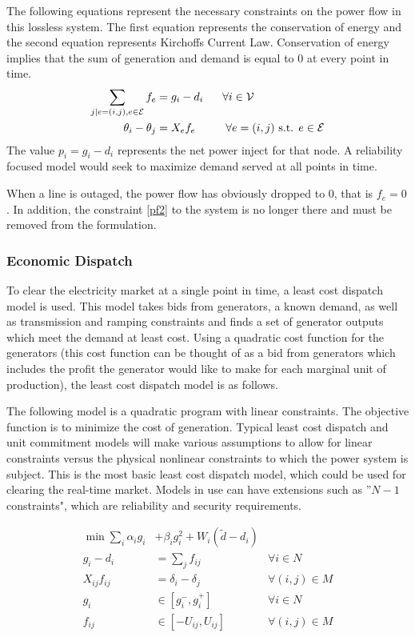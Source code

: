 The following equations represent the necessary constraints on the power flow in this lossless system.  The first equation represents the conservation of energy and the second equation represents Kirchoffs Current Law.  Conservation of energy implies that the sum of generation and demand is equal to 0 at every point in time.
\begin{align}	\displaystyle
\sum_{j | e=(i,j),  e \in \cE}{f_{e}} &= g_{i} -d_{i} \hspace{17px}   \forall i \in \cV   \label{pf1}
\\
\theta_{i} - \theta_{j} &= X_{e} f_{e}			\hspace{27px}	\forall e=(i,j) \mbox{ s.t. } e \in \cE   \label{pf2}
\end{align}
The value $p_{i} = g_{i} - d_{i}$ represents the net power inject for that node.  A reliability focused model would seek to maximize demand served at all points in time.

When a line is outaged, the power flow has obviously dropped to 0, that is $f_e = 0$.  In addition, the constraint \ref{pf2} to the system is no longer there and must be removed from the formulation.

\subsubsection{Economic Dispatch}
To clear the electricity market at a single point in time, a least cost dispatch model is used.  This model takes bids from generators, a known demand, as well as transmission and ramping constraints and finds a set of generator outputs which meet the demand at least cost.  Using a quadratic cost function for the generators (this cost function can be thought of as a bid from generators which includes the profit the generator would like to make for each marginal unit of production), the least cost dispatch model is as follows. 

The following model is a quadratic program with linear constraints.  The objective function is to minimize the cost of generation.  Typical least cost dispatch and unit commitment models will make various assumptions to allow for linear constraints versus the physical nonlinear constraints to which the power system is subject.  This is the most basic least cost dispatch model, which could be used for clearing the real-time market.  Models in use can have extensions such as ''$N-1$ constraints", which are reliability and security requirements.

\begin{subequations}
\begin{align}
 \min \sum_i \alpha_i g_i &+ \beta_i g_i^2	+ W_i(\tilde{d} - d_i)&	\\
g_i - d_i &= \sum_j f_{ij}	&	\forall i \in N 	\\
X_{ij} f_{ij} &= \delta_i - \delta_j & \forall (i,j) \in M \\
g_i  &\in \left[ g_i^- , g_i^+ \right]		&	\forall i \in N 	\\
f_{ij} &\in \left[ -U_{ij}, U_{ij} \right]	&	\forall (i,j) \in M 
\end{align}
\label{leastcostdispatch}
\end{subequations}

